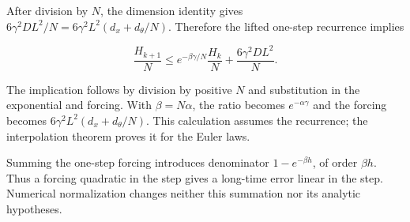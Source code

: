 \documentclass[11pt,a4paper]{report}
\begin{document}
After division by \(N\), the dimension identity gives \(6\gamma^2DL^2/N=6\gamma^2L^2(d_x+d_\theta/N)\). Therefore the lifted one-step recurrence implies

\[\frac{H_{k+1}}N\le e^{-\beta\gamma/N}\frac{H_k}N+\frac{6\gamma^2DL^2}{N}.\]

The implication follows by division by positive \(N\) and substitution in the exponential and forcing. With \(\beta=N\alpha\), the ratio becomes \(e^{-\alpha\gamma}\) and the forcing becomes \(6\gamma^2L^2(d_x+d_\theta/N)\). This calculation assumes the recurrence; the interpolation theorem proves it for the Euler laws.



Summing the one-step forcing introduces denominator \(1-e^{-\beta h}\), of order \(\beta h\). Thus a forcing quadratic in the step gives a long-time error linear in the step. Numerical normalization changes neither this summation nor its analytic hypotheses.
\end{document}
